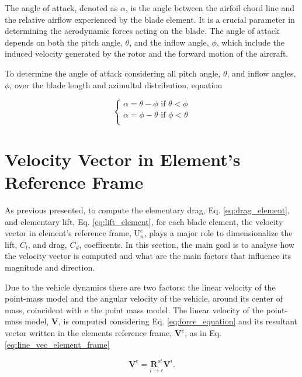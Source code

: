 The angle of attack, denoted as $\alpha$, is the angle between the airfoil chord line and the relative airflow experienced by the blade element. It is a crucial parameter in determining the aerodynamic forces acting on the blade. The angle of attack depends on both the pitch angle,  $\theta$, and the inflow angle, $\phi$, which include the induced velocity generated by the rotor and the forward motion of the aircraft. 

To determine the angle of attack considering all pitch angle, $\theta$, and inflow angles, $\phi$, over the blade length and azimultal distribution, equation 

\begin{equation}
    \begin{cases}
        \alpha = \theta - \phi \text{ if } \theta < \phi\\
        \alpha = \phi - \theta \text{ if } \phi < \theta\\
    \end{cases}
    \label{eq:angle_of_attack}
\end{equation}

\section{Velocity Vector in Element's Reference Frame}
\label{sec:velocity_element_bet}

As previous presented, to compute the elementary drag, Eq. \ref{eq:drag_element}, and elementary lift, Eq. \ref{eq:lift_element}, for each blade element, the velocity vector in element's reference frame, $\mathrm{U}_n^e$, plays a major role to dimensionalize the lift, $C_l$, and drag, $C_d$, coefficents. In this section, the main goal is to analyse how the velocity vector is computed and what are the main factors that influence its magnitude and direction.

Due to the vehicle dynamics there are two factors: the linear velocity of the point-mass model and the angular velocity of the vehicle,  around its center of mass, coincident with e the point mass model. The linear velocity of the point-mass model, $\mathbf{V}$, is computed considering Eq. \ref{eq:force_equation} and its resultant vector written in the elements reference frame, $\mathbf{V}^e$, as in Eq. \ref{eq:line_vec_element_frame}

\begin{equation}
    \mathbf{V}^e = \underset{i \to e}{\boldsymbol{R}^{ot}} \mathbf{V}^i.
    \label{eq:line_vec_element_frame}
\end{equation}

